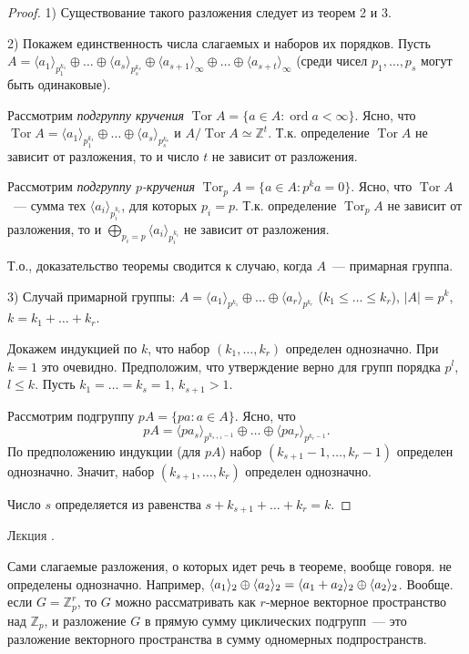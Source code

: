\documentclass[a4paper]{article}
\newcounter{lec}
\renewcommand{\thelec}{\Roman{lec}}
\newcommand*{\lecture}[1]{\refstepcounter{lec}\vspace{20pt}
\begin{center}{\rmfamily\textsc{Лекция \thelec. \\ \textbf{#1}}}\vspace{5pt}
\end{center}}
\newcommand{\ord}{\mathop{\mathrm{ord}}\nolimits}
\newcommand{\Tor}{\mathop{\mathrm{Tor}}\nolimits}
\newcommand*{\p}[1]{#1\nobreak\discretionary{}{\hbox{$\mathsurround=0pt #1$}}{}}
\begin{document}
\begin{proof}
1) Существование такого разложения следует из теорем 2 и 3.

2) Покажем единственность числа слагаемых и наборов их порядков.
Пусть $A=\langle a_1\rangle_{p_1^{k_1}}\oplus\ldots\oplus\langle
a_s\rangle_{p_s^{k_s}}\oplus\langle
a_{s+1}\rangle_\infty\oplus\ldots\oplus\langle
a_{s+t}\rangle_\infty$ (среди чисел $p_1,\ldots,p_s$ могут быть
одинаковые).

Рассмотрим \emph{подгруппу кручения} $\Tor A=\{a\in A:\ord
a<\infty\}$. Ясно, что $\Tor A=\langle
a_1\rangle_{p_1^{k_1}}\oplus\ldots\oplus\langle
a_s\rangle_{p_s^{k_s}}$ и $A/\Tor A\simeq\mathbb{Z}^t$. Т.к.
определение $\Tor A$ не зависит от разложения, то и число $t$ не
зависит от разложения.

Рассмотрим \emph{подгруппу $p$-кручения} $\Tor_p A=\{a\in
A:p^ka=0\}$. Ясно, что $\Tor A$~--- сумма тех $\langle
a_i\rangle_{p_i^{k_i}}$, для которых $p_i=p$. Т.к. определение
$\Tor_pA$ не зависит от разложения, то и
$\bigoplus\limits_{p_i=p}\langle a_i\rangle_{p_i^{k_i}}$ не зависит
от разложения.

Т.о., доказательство теоремы сводится к случаю, когда $A$~---
примарная группа.

3) Случай примарной группы: $A=\langle
a_1\rangle_{p^{k_1}}\oplus\ldots\oplus\langle a_r\rangle_{p^{k_r}}$
($k_1\leqslant\ldots\leqslant k_r$), $|A|=p^k$, $k=k_1+\ldots+k_r$.

Докажем индукцией по $k$, что набор $(k_1,\ldots,k_r)$ определен
однозначно. При $k=1$ это очевидно. Предположим, что утверждение
верно для групп порядка $p^l$, $l\leqslant k$. Пусть
$k_1=\ldots=k_s=1$, $k_{s+1}>1$.

Рассмотрим подгруппу $pA=\{pa: a\in A\}$. Ясно, что
$$pA=\langle
pa_s\rangle_{p^{k_{s+1}-1}}\oplus\ldots\oplus\langle
pa_r\rangle_{p^{k_r-1}}.$$ По предположению индукции (для $pA$)
набор $(k_{s+1}-1,\ldots,k_r-1)$ определен однозначно. Значит, набор
$(k_{s+1},\ldots,k_r)$ определен однозначно.

Число $s$ определяется из равенства $s+k_{s+1}+\ldots+k_r=k$.
\end{proof}
\lecture{}

\begin{zam}
Сами слагаемые разложения, о которых идет речь в теореме, вообще
говоря. не определены однозначно. Например, $\langle
a_1\rangle_2\oplus\langle a_2\rangle_2\p=\langle
a_1+a_2\rangle_2\oplus\langle a_2\rangle_2$. Вообще. если
$G=\mathbb{Z}_p^r$, то $G$ можно рассматривать как $r$-мерное
векторное пространство над $\mathbb{Z}_p$, и разложение $G$ в прямую
сумму циклических подгрупп~--- это разложение векторного
пространства в сумму одномерных подпространств.
\end{zam}
\end{document}
